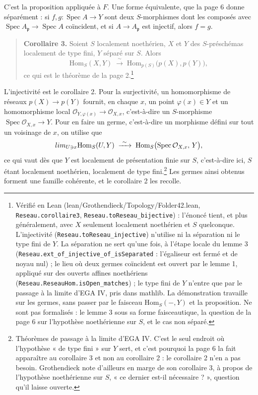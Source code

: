 \documentclass[11pt,a4paper]{article}
\begin{document}
C'est la proposition appliquée à $F$. Une forme équivalente, que la page 6
donne séparément : si $f, g : \operatorname{Spec} A \to Y$ sont deux
$S$-morphismes dont les composés avec $\operatorname{Spec} A_{\mathfrak p} \to
\operatorname{Spec} A$ coïncident, et si $A \to A_{\mathfrak p}$ est injectif,
alors $f = g$.

\begin{quote}
\textbf{Corollaire 3.} Soient $S$ localement noethérien, $X$ et $Y$ des
$S$-préschémas localement de type fini, $Y$ séparé sur $S$. Alors
\[ \mathrm{Hom}_S(X, Y) \;\xrightarrow{\ \sim\ }\;
   \mathrm{Hom}_{p(S)}\bigl(p(X), p(Y)\bigr), \]
ce qui est le théorème de la page 2.\footnote{Vérifié en Lean
(lean/Grothendieck/Topology/Folder42.lean, \texttt{Reseau.corollaire3},
\texttt{Reseau.toReseau\_bijective}) : l'énoncé tient, et plus généralement,
avec $X$ seulement localement noethérien et $S$ quelconque. L'injectivité
(\texttt{Reseau.toReseau\_injective}) n'utilise ni la séparation ni le type
fini de $Y$. La séparation ne sert qu'une fois, à l'étape locale du lemme 3
(\texttt{Reseau.ext\_of\_injective\_of\_isSeparated} : l'égaliseur est fermé
et de noyau nul) ; le lieu où deux germes coïncident est ouvert par le
lemme 1, appliqué sur des ouverts affines noethériens
(\texttt{Reseau.ReseauHom.isOpen\_matches}) ; le type fini de $Y$ n'entre que
par le passage à la limite d'EGA IV, pris dans mathlib. La démonstration
travaille sur les germes, sans passer par le faisceau $\mathrm{Hom}_S(-, Y)$
et la proposition. Ne sont pas formalisés : le lemme 3 sous sa forme
faisceautique, la question de la page 6 sur l'hypothèse noethérienne sur
$S$, et le cas non séparé.}
\end{quote}

L'injectivité est le corollaire 2. Pour la surjectivité, un homomorphisme de
réseaux $p(X) \to p(Y)$ fournit, en chaque $x$, un point $\varphi(x) \in Y$ et
un homomorphisme local $\mathcal{O}_{Y, \varphi(x)} \to \mathcal{O}_{X,x}$,
c'est-à-dire un $S$-morphisme $\operatorname{Spec} \mathcal{O}_{X,x} \to Y$.
Pour en faire un germe, c'est-à-dire un morphisme défini sur tout un
voisinage de $x$, on utilise que
\[ \varinjlim_{U \ni x} \mathrm{Hom}_S(U, Y)
   \;\xrightarrow{\ \sim\ }\;
   \mathrm{Hom}_S\bigl(\operatorname{Spec} \mathcal{O}_{X,x},\, Y\bigr), \]
ce qui vaut dès que $Y$ est localement de présentation finie sur $S$,
c'est-à-dire ici, $S$ étant localement noethérien, localement de type
fini.\footnote{Théorèmes de passage à la limite d'EGA IV. C'est le seul
endroit où l'hypothèse « de type fini » sur $Y$ sert, et c'est pourquoi la
page 6 la fait apparaître au corollaire 3 et non au corollaire 2 : le
corollaire 2 n'en a pas besoin. Grothendieck note d'ailleurs en marge de son
corollaire 3, à propos de l'hypothèse noethérienne sur $S$, « ce dernier
est-il nécessaire ? », question qu'il laisse ouverte.} Les germes ainsi
obtenus forment une famille cohérente, et le corollaire 2 les recolle.
\end{document}
